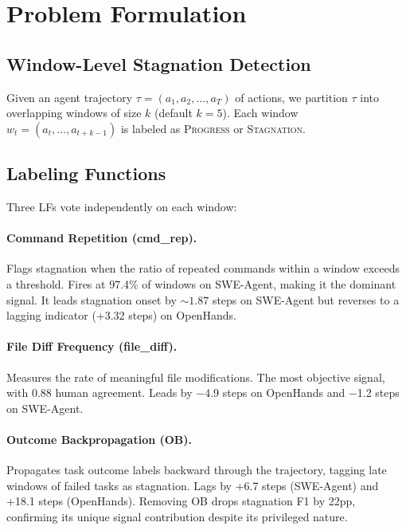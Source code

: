 \documentclass[11pt]{article}
\begin{document}
\section{Problem Formulation}
\label{sec:method}

\subsection{Window-Level Stagnation Detection}

Given an agent trajectory $\tau = (a_1, a_2, \ldots, a_T)$ of actions, we partition $\tau$ into overlapping windows of size $k$ (default $k{=}5$).
Each window $w_t = (a_{t}, \ldots, a_{t+k-1})$ is labeled as \textsc{Progress} or \textsc{Stagnation}.

\subsection{Labeling Functions}

Three LFs vote independently on each window:

\paragraph{Command Repetition (cmd\_rep).} Flags stagnation when the ratio of repeated commands within a window exceeds a threshold. Fires at 97.4\% of windows on SWE-Agent, making it the dominant signal. It leads stagnation onset by ${\sim}1.87$ steps on SWE-Agent but reverses to a lagging indicator (+3.32 steps) on OpenHands.

\paragraph{File Diff Frequency (file\_diff).} Measures the rate of meaningful file modifications. The most objective signal, with 0.88 human agreement. Leads by $-$4.9 steps on OpenHands and $-$1.2 steps on SWE-Agent.

\paragraph{Outcome Backpropagation (OB).} Propagates task outcome labels backward through the trajectory, tagging late windows of failed tasks as stagnation. Lags by +6.7 steps (SWE-Agent) and +18.1 steps (OpenHands). Removing OB drops stagnation F1 by 22pp, confirming its unique signal contribution despite its privileged nature.
\end{document}
